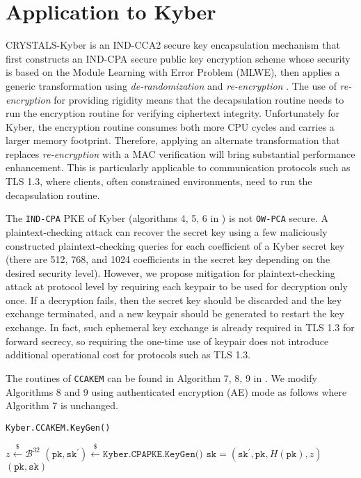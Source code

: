 \documentclass[floatrow,journal=tches,submission]{iacrtrans}
\newcommand{\pk}{\texttt{pk}}
\newcommand{\sk}{\texttt{sk}}
\newcommand{\leftsample}{\stackrel{\$}{\leftarrow}}
\begin{document}
% 

\section{Application to Kyber}\label{sec:experimental-results}
CRYSTALS-Kyber \cite{bos2018crystals}\cite{avanzi2019crystals} is an IND-CCA2 secure key encapsulation mechanism that first constructs an IND-CPA secure public key encryption scheme whose security is based on the Module Learning with Error Problem (MLWE), then applies a generic transformation using \emph{de-randomization} and \emph{re-encryption} \cite{hofheinz2017modular}. The use of \emph{re-encryption} for providing rigidity means that the decapsulation routine needs to run the encryption routine for verifying ciphertext integrity. Unfortunately for Kyber, the encryption routine consumes both more CPU cycles and carries a larger memory footprint. Therefore, applying an alternate transformation that replaces \emph{re-encryption} with a MAC verification will bring substantial performance enhancement. This is particularly applicable to communication protocols such as TLS 1.3, where clients, often constrained environments, need to run the decapsulation routine.

The \texttt{IND-CPA} PKE of Kyber (algorithms 4, 5, 6 in \cite{avanzi2019crystals}) is not \texttt{OW-PCA} secure. A plaintext-checking attack \cite{ravi2019generic} can recover the secret key using a few maliciously constructed plaintext-checking queries for each coefficient of a Kyber secret key (there are 512, 768, and 1024 coefficients in the secret key depending on the desired security level). However, we propose mitigation for plaintext-checking attack at protocol level by requiring each keypair to be used for decryption only once. If a decryption fails, then the secret key should be discarded and the key exchange terminated, and a new keypair should be generated to restart the key exchange. In fact, such ephemeral key exchange is already required in TLS 1.3 for forward secrecy, so requiring the one-time use of keypair does not introduce additional operational cost for protocols such as TLS 1.3.

The routines of \texttt{CCAKEM} can be found in Algorithm 7, 8, 9 in \cite{avanzi2019crystals}. We modify Algorithms 8 and 9 using authenticated encryption (AE)  mode as follows where Algorithm 7 is unchanged.

\begin{algorithm}[H]
    \caption{\texttt{Kyber.CCAKEM.KeyGen()}}\label{alg:kyber-ae-keygen}
    \begin{algorithmic}[1]
        \State $z \leftsample \mathcal{B}^{32}$
        \State $(\pk, \sk^\prime) \leftsample \texttt{Kyber.CPAPKE.KeyGen()}$
        \State $\sk = (\sk^\prime, \pk, H(\pk), z)$
        \State \Return $(\pk, \sk)$
    \end{algorithmic}
\end{algorithm}
\end{document}
